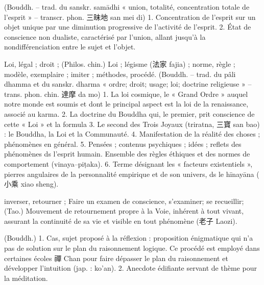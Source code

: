 \begin{Def}[ ding 定]
    (Bouddh. – trad. du sanskr. samādhi « union, totalité, concentration totale de l’esprit » – transcr. phon. 三昧地 san mei di) 1. Concentration de l’esprit sur un objet unique par une diminution progressive de l’activité de l’esprit. 2.  État de conscience non dualiste, caractérisé par l’union, allant jusqu’à la nondifférenciation entre le sujet et l’objet. 
\end{Def}
\begin{Def}[fa 法]
    Loi, légal ; droit ; (Philos. chin.) Loi ; légisme (法家 fajia) ; norme, règle ; modèle, exemplaire ; imiter ; méthodes, procédé. (Bouddh. – trad. du pâli dhamma et du sanskr. dharma « ordre; droit; usage; loi; doctrine religieuse » – trans. phon. chin. 達摩 da mo) 1. La loi cosmique, le « Grand Ordre » auquel notre monde est soumis et dont le principal aspect est la loi de la renaissance, associé au karma. 2. La doctrine du Bouddha qui, le premier, prit conscience de cette « Loi » et la formula 3. Le second des Trois Joyaux (triratna, 三寶 san bao) : le Bouddha, la Loi et la Communauté. 4. Manifestation de la réalité des choses ; phénomènes en général. 5. Pensées ; contenus psychiques ; idées ; reflets des phénomènes ds l’esprit humain. Ensemble des règles éthiques et des normes de comportement (vinaya–piṭaka).  6. Terme désignant les « facteurs existentiels », pierres angulaires de la personnalité empirique et de son univers, ds le hīnayāna ( 小乘 xiao sheng).
\end{Def}
\begin{Def}[fan 反]
    inverser, retourner ; Faire un examen de conscience, s’examiner; se recueillir; (Tao.) Mouvement de retournement propre à la Voie, inhérent à tout vivant, assurant la continuité de sa vie et visible en tout phénomène (老子 Laozi). 
\end{Def}
\begin{Def}[gong’an 公案]
    (Bouddh.) 1. Cas, sujet proposé à la réflexion : proposition énigmatique qui n’a pas de solution sur le plan du raisonnement logique. Ce procédé est employé dans certaines écoles 禪 Chan pour faire dépasser le plan du raisonnement et développer l’intuition (jap. : ko’an).  2. Anecdote édifiante servant de thème pour la méditation.
\end{Def}
